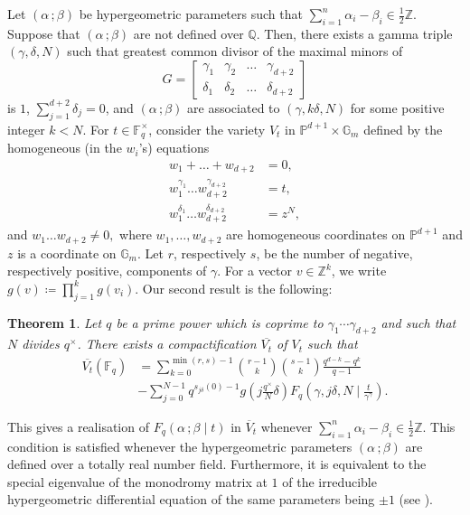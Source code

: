 \documentclass[11pt, reqno]{amsart}
\theoremstyle{plain}
\newtheorem{theo}{Theorem}[section]
\theoremstyle{definition}
\newcommand{\Z}{\mathbb{Z}}
\newcommand{\Ps}{\mathbb{P}}
\newcommand{\Q}{\mathbb{Q}}
\newcommand{\F}{\mathbb{F}}
\newcommand{\ga}{\gamma}
\newcommand{\G}{\mathbb{G}}
\newcommand{\be}{\beta}
\newcommand{\al}{\alpha}
\begin{document}
Let  $(\al \,; \be)$ be hypergeometric parameters such that $\sum_{i=1}^{n} \al_i - \be_i  \in \frac{1}{2} \Z$. Suppose that $(\al \, ; \be)$ are not defined over $\Q$. Then, there exists a gamma triple $(\ga,\delta,N)$ such that greatest common divisor of the maximal minors of
\[
G= \begin{bmatrix}
\ga_1 &\ga_2 & \dots &\ga_{d+2} \\
\delta_1& \delta_2 &  \dots & \delta_{d+2} 
\end{bmatrix}
\]
is $1$, $\sum_{j=1}^{d+2} \delta_j =0$, and  $(\al \, ; \be)$ are associated to $(\ga,k\delta,N)$ for some positive integer $k < N$.
For $t \in \F_q^\times$, consider the variety $V_{t}$ in $\Ps^{d+1} \times \G_m$ defined by the homogeneous (in the $w_i$'s) equations 
\begin{align*}
    w_1 + \dots +w_{d+2} &= 0, \\
    w_1^{\ga_1}\dots w_{d+2}^{\ga_{d+2}} &= t,\\
    w_1^{\delta_1} \dots w_{d+2}^{\delta_{d+2}} &= z^{N},
\end{align*}
and $ w_1\dots w_{d+2} \neq 0,$ where $w_1, \dots, w_{d+2}$ are homogeneous coordinates on $\Ps^{d+1}$ and $z$ is a coordinate on $\G_m$. 
Let $r$, respectively $s$, be the number of negative, respectively positive, components of $\ga$.
For a vector $v \in \Z^{k}$, we write $g(v) \coloneqq \prod_{j=1}^{k} g(v_i)$.
Our second result is the following:
\begin{theo}\label{theo:intro-realisation}
Let $q$ be a prime power which is coprime to $\ga_1 \cdots\ga_{d+2}$ and such that $N$ divides $q^\times$. There exists a compactification $\overline{V_{t}}$ of $V_{t}$ such that
   \begin{align*}
    \overline{V_{t}}(\F_q) &=  \sum_{k=0}^{\min{(r,s)-1}} {\binom{r-1}{k}}{\binom{s-1}{k}} \frac{q^{d-k} - q^{k} }{q-1} \\
    &-\sum_{j=0}^{N-1} q^{s_{j\delta}(0)-1} g\left(j\frac{q^\times}{N} \delta \right) F_q\left(\gamma, j \delta, N \mid \frac{t}{\gamma^\gamma}\right).
    \end{align*}
\end{theo}
This gives a realisation of $F_q(\al \, ; \be \mid t)$ in $\overline{V}_t$ whenever $\sum_{i=1}^{n} \al_i - \be_i \in \frac{1}{2}\mathbb{Z}$. This condition is satisfied whenever the hypergeometric parameters $(\al \,; \be)$ are defined over a totally real number field. 
Furthermore, it is equivalent to the special eigenvalue of the monodromy matrix at $1$ of the irreducible hypergeometric differential equation of the same parameters being $\pm 1$ (see \cite[Equation (2.8), Proposition 2.10]{beukers-field-of-defin}).
\end{document}
